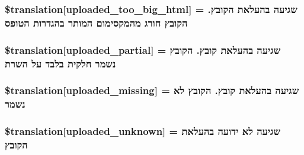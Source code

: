 \subsubsection[{\$translation}]{\setlength{\rightskip}{0pt plus 5cm}\$translation\mbox{[}\textquotesingle{}uploaded\+\_\+too\+\_\+big\+\_\+html\textquotesingle{}\mbox{]} = \textquotesingle{}שגיעה בהעלאת הקובץ. הקובץ חורג מהמקסימום המותר בהגדרות הטופס\textquotesingle{}}\label{class_8upload_8he___i_l_8php_a623d5b8b92169f57d7e43458aa911cbb}
\hypertarget{class_8upload_8he___i_l_8php_a967c17da21b0a2d3bd65cca3a9ca0ea8}{}
\subsubsection[{\$translation}]{\setlength{\rightskip}{0pt plus 5cm}\$translation\mbox{[}\textquotesingle{}uploaded\+\_\+partial\textquotesingle{}\mbox{]} = \textquotesingle{}שגיעה בהעלאת קובץ. הקובץ נשמר חלקית בלבד על השרת\textquotesingle{}}\label{class_8upload_8he___i_l_8php_a967c17da21b0a2d3bd65cca3a9ca0ea8}
\hypertarget{class_8upload_8he___i_l_8php_a0cce433260be65f1f35853a6b4b8952b}{}
\subsubsection[{\$translation}]{\setlength{\rightskip}{0pt plus 5cm}\$translation\mbox{[}\textquotesingle{}uploaded\+\_\+missing\textquotesingle{}\mbox{]} = \textquotesingle{}שגיעה בהעלאת קובץ. הקובץ לא נשמר\textquotesingle{}}\label{class_8upload_8he___i_l_8php_a0cce433260be65f1f35853a6b4b8952b}
\hypertarget{class_8upload_8he___i_l_8php_a4a9168e922b827e6a28b5db1c00774ca}{}
\subsubsection[{\$translation}]{\setlength{\rightskip}{0pt plus 5cm}\$translation\mbox{[}\textquotesingle{}uploaded\+\_\+unknown\textquotesingle{}\mbox{]} = \textquotesingle{}שגיעה לא ידועה בהעלאת הקובץ\textquotesingle{}}\label{class_8upload_8he___i_l_8php_a4a9168e922b827e6a28b5db1c00774ca}
\hypertarget{class_8upload_8he___i_l_8php_a3afc377bd803683314f413a814243066}{}
